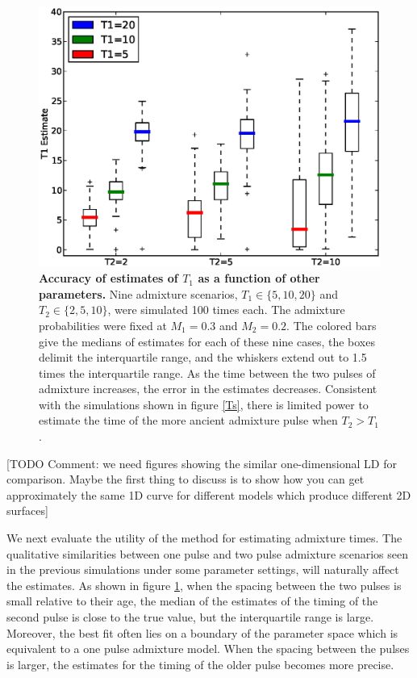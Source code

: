 \begin{figure}
\includegraphics[scale=.6]{estimates.eps}
\caption{
{\bf Accuracy of estimates of $T_1$ as a function of other parameters.} Nine admixture scenarios, $T_1\in \{5,10,20\}$ and $T_2\in\{2,5,10\}$, were simulated 100 times each. The admixture probabilities were fixed at $M_1=0.3$ and $M_2=0.2$. The colored bars give the medians of estimates for each of these nine cases, the boxes delimit the interquartile range, and the whiskers extend out to 1.5 times the interquartile range. As the time between the two pulses of admixture increases, the error in the estimates decreases. Consistent with the simulations shown in figure \ref{Ts}, there is limited power to estimate the time of the more ancient admixture pulse when $T_2>T_1$.
}
\label{estimates}
\end{figure}

[TODO Comment: we need  figures showing the similar one-dimensional LD for comparison.  Maybe the first thing to discuss is to show how you can get approximately the same 1D curve for different models which produce different 2D surfaces]

We next evaluate the utility of the method for estimating admixture times.  The qualitative similarities between one pulse and two pulse admixture scenarios seen in the previous  simulations under some parameter settings, will naturally affect  the estimates. As shown in figure \ref{estimates}, when the spacing between the two pulses is small relative to their age, the median of the estimates of the timing of the second pulse is close to the true value, but the interquartile range is large. Moreover, the best fit often lies on a boundary of the parameter space which is equivalent to a one pulse admixture model. When the spacing between the pulses is larger, the estimates for the timing of the older pulse becomes more precise.
